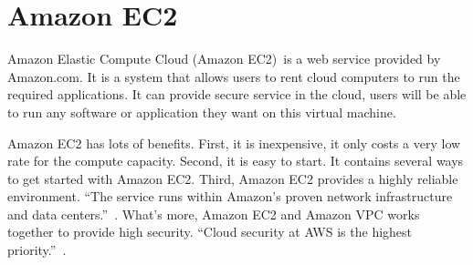 \section{Amazon EC2}
Amazon Elastic Compute Cloud (Amazon EC2)~\cite{www-amazonec2}is 
a web service provided by Amazon.com. It is a system that allows
users to rent cloud computers to run the required applications.
It can provide secure service in the cloud, users will be able
to run any software or application they want on this virtual machine.

Amazon EC2 has lots of benefits. First, it is inexpensive, it only 
costs a very low rate for the compute capacity. Second, it is easy to
start. It contains several ways to get started with Amazon EC2. Third,
Amazon EC2 provides a highly reliable environment. ``The service runs 
within Amazon's proven network infrastructure and data centers.''~\cite{www-amazonec2}.
What's more, Amazon EC2 and Amazon VPC works together to provide high
security. ``Cloud security at AWS is the highest priority.''~\cite{www-amazonec2}.

